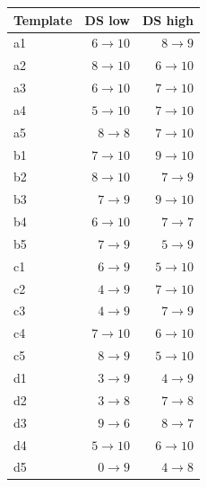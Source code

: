 \begin{tabular}{@{}lrr@{}}
\toprule
Template & DS low & DS high\\
\midrule
a1 & $6\to10$ & $8\to9$\\
a2 & $8\to10$ & $6\to10$\\
a3 & $6\to10$ & $7\to10$\\
a4 & $5\to10$ & $7\to10$\\
a5 & $8\to8$ & $7\to10$\\
\midrule
b1 & $7\to10$ & $9\to10$\\
b2 & $8\to10$ & $7\to9$\\
b3 & $7\to9$ & $9\to10$\\
b4 & $6\to10$ & $7\to7$\\
b5 & $7\to9$ & $5\to9$\\
\midrule
c1 & $6\to9$ & $5\to10$\\
c2 & $4\to9$ & $7\to10$\\
c3 & $4\to9$ & $7\to9$\\
c4 & $7\to10$ & $6\to10$\\
c5 & $8\to9$ & $5\to10$\\
\midrule
d1 & $3\to9$ & $4\to9$\\
d2 & $3\to8$ & $7\to8$\\
d3 & $9\to6$ & $8\to7$\\
d4 & $5\to10$ & $6\to10$\\
d5 & $0\to9$ & $4\to8$\\
\bottomrule
\end{tabular}
